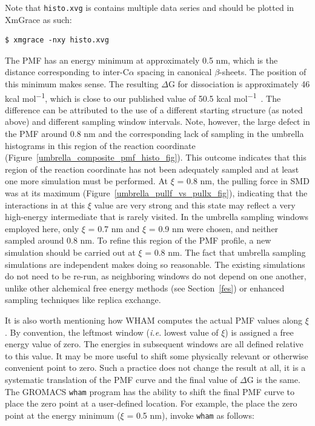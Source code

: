 \documentclass[9pt,tutorial]{livecoms}
\begin{document}
Note that \texttt{histo.xvg} is contains multiple data series and should be plotted in XmGrace as such:

\begin{verbatim}
$ xmgrace -nxy histo.xvg
\end{verbatim}

The PMF has an energy minimum at approximately 0.5 nm, which is the distance corresponding to inter-C$\alpha$ spacing in canonical $\beta$-sheets. The position of this minimum makes sense. The resulting $\Delta$G for dissociation is approximately 46 kcal mol\textsuperscript{$-$1}, which is close to our published value of 50.5 kcal mol\textsuperscript{$-$1}~\cite{Lemkul2010}. The difference can be attributed to the use of a different starting structure (as noted above) and different sampling window intervals. Note, however, the large defect in the PMF around 0.8 nm and the corresponding lack of sampling in the umbrella histograms in this region of the reaction coordinate (Figure~\ref{umbrella_composite_pmf_histo_fig}). This outcome indicates that this region of the reaction coordinate has not been adequately sampled and at least one more simulation must be performed. At $\xi$ = 0.8 nm, the pulling force in SMD was at its maximum (Figure~\ref{umbrella_pullf_vs_pullx_fig}), indicating that the interactions in at this $\xi$ value are very strong and this state may reflect a very high-energy intermediate that is rarely visited. In the umbrella sampling windows employed here, only $\xi$ = 0.7 nm and $\xi$ = 0.9 nm were chosen, and neither sampled around 0.8 nm. To refine this region of the PMF profile, a new simulation should be carried out at $\xi$ = 0.8 nm. The fact that umbrella sampling simulations are independent makes doing so reasonable. The existing simulations do not need to be re-run, as neighboring windows do not depend on one another, unlike other alchemical free energy methods (see Section~\ref{fes}) or enhanced sampling techniques like replica exchange.

It is also worth mentioning how WHAM computes the actual PMF values along $\xi$. By convention, the leftmost window ({\em i.e.} lowest value of $\xi$) is assigned a free energy value of zero. The energies in subsequent windows are all defined relative to this value. It may be more useful to shift some physically relevant or otherwise convenient point to zero. Such a practice does not change the result at all, it is a systematic translation of the PMF curve and the final value of $\Delta$G is the same. The GROMACS \texttt{wham} program has the ability to shift the final PMF curve to place the zero point at a user-defined location. For example, the place the zero point at the energy minimum ($\xi$ = 0.5 nm), invoke \texttt{wham} as follows:
\end{document}
